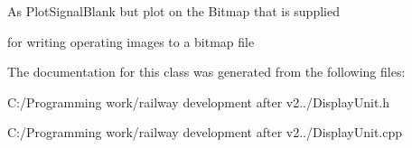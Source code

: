 As Plot\+Signal\+Blank but plot on the Bitmap that is supplied
\begin{DoxyItemize}
\item for writing operating images to a bitmap file 
\end{DoxyItemize}

The documentation for this class was generated from the following files\+:\begin{DoxyCompactItemize}
\item 
C\+:/\+Programming work/railway development after v2../Display\+Unit.\+h\item 
C\+:/\+Programming work/railway development after v2../Display\+Unit.\+cpp\end{DoxyCompactItemize}
